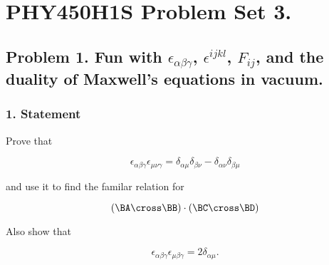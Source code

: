 %


\author{Peeter Joot}

\chapter{PHY450H1S Problem Set 3.}
\label{chap:relElectroDynProblemSet3}
\date{Feb 15, 2011}

\beginArtNoToc
%

\section{Problem 1.  Fun with $\epsilon_{\alpha\beta\gamma}$, $\epsilon^{ijkl}$, $F_{ij}$, and the duality of Maxwell's equations in vacuum.}

\subsection{1. Statement}

Prove that

\begin{equation}\label{eqn:relElectroDynProblemSet3:10}
\epsilon_{\alpha \beta \gamma}
\epsilon_{\mu \nu \gamma}
=
\delta_{\alpha\mu} \delta_{\beta\nu}
-\delta_{\alpha\nu} \delta_{\beta\mu}
\end{equation}

and use it to find the familar relation for

\begin{equation}\label{eqn:relElectroDynProblemSet3:30}
(\BA \cross \BB) \cdot (\BC \cross \BD)
\end{equation}

Also show that

\begin{equation}\label{eqn:relElectroDynProblemSet3:50}
\epsilon_{\alpha \beta \gamma}
\epsilon_{\mu \beta \gamma}
=
2 \delta_{\alpha\mu}.
\end{equation}

